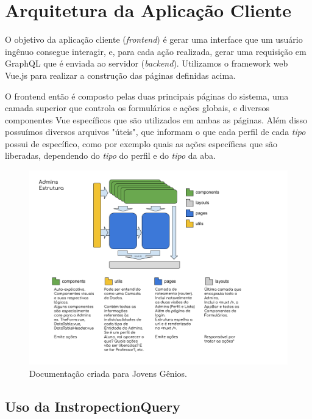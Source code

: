 \section{Arquitetura da Aplicação Cliente}

O objetivo da aplicação cliente (\textit{frontend}) é gerar uma interface que um usuário ingênuo consegue interagir, e, para cada ação realizada, gerar uma requisição em GraphQL que é enviada ao servidor (\textit{backend}). Utilizamos o framework web Vue.js para realizar a construção das páginas definidas acima.

O frontend então é composto pelas duas principais páginas do sistema, uma camada superior que controla os formulários e ações globais, e diversos componentes Vue específicos que são utilizados em ambas as páginas. Além disso possuímos diversos arquivos "úteis", que informam o que cada perfil de cada \textit{tipo} possui de específico, como por exemplo quais as ações específicas que são liberadas, dependendo do \textit{tipo} do perfil e do \textit{tipo} da aba.

\begin{figure}[H]
    \centering
    \includegraphics[width=1.0\linewidth]{Imagens/chap04/front-estrutura.png}
    \caption{Documentação criada para Jovens Gênios.}
    \label{fig:profile-exemple}
\end{figure}

\subsection{Uso da InstropectionQuery}

